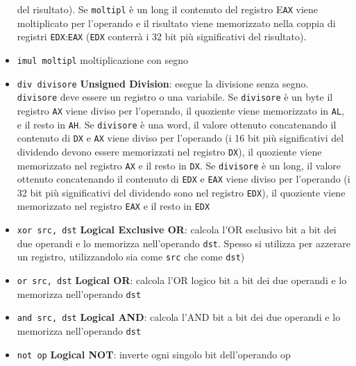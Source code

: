 \documentclass[a4paper]{article}
\theoremstyle{break}
\theoremstyle{break}
\theoremstyle{break}
\theoremstyle{break}
\begin{document}
\begin{itemize}
	      del risultato). Se \texttt{moltipl} è un long il contenuto del
	      registro E\texttt{AX} viene moltiplicato per l'operando e il
	      risultato viene memorizzato nella coppia di registri
	      \texttt{EDX}:\texttt{EAX} (\texttt{EDX} conterrà i 32 bit più significativi del
	      risultato).
	\item \texttt{imul moltipl} \quad moltiplicazione con segno
	\item \texttt{div divisore} \quad \textbf{Unsigned Division}:
	      esegue la divisione senza segno.
	      \texttt{divisore} deve essere un registro o una variabile. Se
	      \texttt{divisore} è un byte il registro \texttt{AX} viene diviso per
	      l'operando, il quoziente viene memorizzato in \texttt{AL}, e il
	      resto in \texttt{AH}. Se \texttt{divisore} è una word, il valore ottenuto
	      concatenando il contenuto di \texttt{DX} e \texttt{AX} viene diviso per
	      l'operando (i 16 bit più significativi del dividendo
	      devono essere memorizzati nel registro \texttt{DX}), il quoziente
	      viene memorizzato nel registro \texttt{AX} e il resto in \texttt{DX}. Se
	      \texttt{divisore} è un long, il valore ottenuto concatenando il
	      contenuto di \texttt{EDX} e \texttt{EAX} viene diviso per l'operando (i
	      32 bit più significativi del dividendo sono nel registro
	      \texttt{EDX}), il quoziente viene memorizzato nel registro \texttt{EAX}
	      e il resto in \texttt{EDX}
	\item \texttt{xor src, dst} \quad \textbf{Logical Exclusive OR}: calcola l'OR esclusivo bit a bit
	      dei due operandi e lo memorizza nell'operando \texttt{dst}.
	      Spesso si utilizza per azzerare un registro, utilizzandolo
	      sia come \texttt{src} che come \texttt{dst})
	\item \texttt{or src, dst} \quad \textbf{Logical OR}: calcola l'OR logico bit a bit dei due
	      operandi e lo memorizza nell'operando \texttt{dst}
	\item \texttt{and src, dst} \quad \textbf{Logical AND}: calcola l'AND bit a bit dei due operandi
	      e lo memorizza nell'operando \texttt{dst}
	\item \texttt{not op} \quad \textbf{Logical NOT}: inverte ogni singolo bit dell'operando op
\end{itemize}
\end{document}
